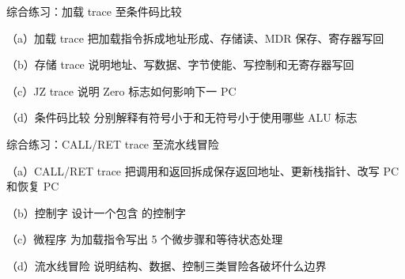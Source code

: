 \begin{chapterexercise}{综合练习：加载 trace 至条件码比较}
\begin{exercisesubproblem}{（a）加载 trace}
把加载指令拆成地址形成、存储读、MDR 保存、寄存器写回
\end{exercisesubproblem}
\begin{exercisesubproblem}{（b）存储 trace}
说明地址、写数据、字节使能、写控制和无寄存器写回
\end{exercisesubproblem}
\begin{exercisesubproblem}{（c）JZ trace}
说明 Zero 标志如何影响下一 PC
\end{exercisesubproblem}
\begin{exercisesubproblem}{（d）条件码比较}
分别解释有符号小于和无符号小于使用哪些 ALU 标志
\end{exercisesubproblem}
\end{chapterexercise}

\begin{chapterexercise}{综合练习：CALL/RET trace 至流水线冒险}
\begin{exercisesubproblem}{（a）CALL/RET trace}
把调用和返回拆成保存返回地址、更新栈指针、改写 PC 和恢复 PC
\end{exercisesubproblem}
\begin{exercisesubproblem}{（b）控制字}
设计一个包含  的控制字
\end{exercisesubproblem}
\begin{exercisesubproblem}{（c）微程序}
为加载指令写出 5 个微步骤和等待状态处理
\end{exercisesubproblem}
\begin{exercisesubproblem}{（d）流水线冒险}
说明结构、数据、控制三类冒险各破坏什么边界
\end{exercisesubproblem}
\end{chapterexercise}

